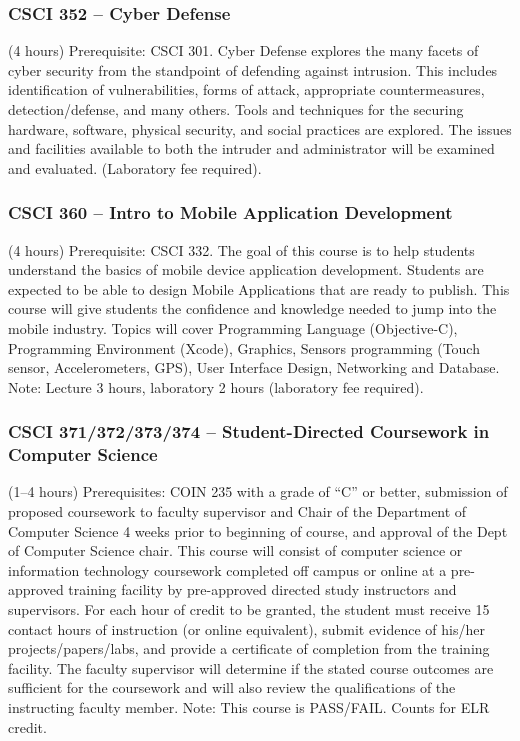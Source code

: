 \subsubsection{CSCI 352 -- Cyber Defense}
(4 hours) Prerequisite: CSCI 301. Cyber Defense explores the many facets of cyber security from the standpoint of defending against intrusion.  This includes identification of vulnerabilities, forms of attack, appropriate countermeasures, detection/defense, and many others.  Tools and techniques for the securing hardware, software, physical security, and social practices are explored.   The issues and facilities available to both the intruder and administrator will be examined and evaluated. (Laboratory fee required).

\subsubsection{CSCI 360 -- Intro to Mobile Application Development}
(4 hours) Prerequisite: CSCI 332. The goal of this course is to help students understand the basics of mobile device application development. Students are expected to be able to design Mobile Applications that are ready to publish. This course will give students the confidence and knowledge needed to jump into the mobile industry. Topics will cover Programming Language (Objective-C), Programming Environment (Xcode), Graphics, Sensors programming (Touch sensor, Accelerometers, GPS), User Interface Design, Networking and Database. Note: Lecture 3 hours, laboratory 2 hours (laboratory fee required).

\subsubsection{CSCI 371/372/373/374 -- Student-Directed Coursework in Computer Science}
(1--4 hours) Prerequisites: COIN 235 with a grade of “C” or better, submission of proposed coursework to faculty supervisor and Chair of the Department of Computer Science 4 weeks prior to beginning of course, and approval of the Dept of Computer Science chair. This course will consist of computer science or information technology coursework completed off campus or online at a pre-approved training facility by pre-approved directed study instructors and supervisors. For each hour of credit to be granted, the student must receive 15 contact hours of instruction (or online equivalent), submit evidence of his/her projects/papers/labs, and provide a certificate of completion from the training facility. The faculty supervisor will determine if the stated course outcomes are sufficient for the coursework and will also review the qualifications of the instructing faculty member.  Note: This course is PASS/FAIL. Counts for ELR credit.

